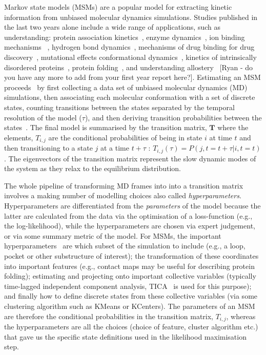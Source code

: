 \documentclass[journal=jacsat,manuscript=article]{achemso}
\begin{document}
Markov state models (MSMs) are a popular model for extracting kinetic information from unbiased molecular dynamics simulations. Studies published in the last two years alone include a wide range of applications, such as understanding:  protein association kinetics~\cite{cannariato_prediction_2022, chakrabarti_litmus_2022}, enzyme dynamics~\cite{koulgi_structural_2021}, ion binding mechanisms~\cite{dutta_distinct_2022, mckiernan_dynamical_2020} , hydrogen bond dynamics~\cite{ibrahim_dynamics_2022}, mechanisms of drug binding for drug discovery~\cite{hu_discovery_2022, pantsar_decisive_2022, hempel_molecular_2021, tosstorff_study_2020, liu_silico_2021}, mutational effects conformational dynamics~\cite{fernandez-quintero_mutation_2021, sharma_comparative_2020}, kinetics of intrinsically disordered proteins~\cite{paul_diversity_2020}, protein folding~\cite{zhou_molecular_2021}, and understanding allostery~\cite{tian_deciphering_2020} [Ryan - do you have any more to add from your first year report here?]. Estimating an MSM proceeds~\cite{noe_markov_2019} by first collecting a data set of unbiased molecular dynamics (MD) simulations, then associating each molecular conformation with a set of discrete states, counting transitions between the states separated by the temporal resolution of the model ($\tau$), and then deriving transition probabilities between the states~\cite{trendelkamp-schroer_estimation_2015}. The final model is summarised by the transition matrix, $\mathbf{T}$ where the elements, $T_{i, j}$ are the conditional probabilities of being in state $i$ at time $t$ and then transitioning to a state $j$ at a time $t+\tau$ : $T_{i,j}(\tau) = P(j, t=t+\tau| i, t=t)$.  The eigenvectors of the transition matrix represent the slow dynamic modes of the system as they relax to the equilibrium distribution. 

The whole pipeline of transforming MD frames into into a transition matrix involves a making number of modelling choices also called \emph{hyperparameters}. Hyperparameters are differentiated from the \emph{parameters} of the model because the latter are calculated from the data via the optimisation of a loss-function (e.g., the log-likelihood), while the hyperparameters are chosen via expert judgement, or via some summary metric of the model\cite{feurer2019hyperparameter}. 
For MSMs, the important hyperparameters~\cite{Optimized_2016, scherer_variational_2019, husic_markov_2018} are which subset of the simulation to include (e.g., a loop, pocket or other substructure of interest); the transformation of these coordinates into important features (e.g., contact maps may be useful for describing protein folding); estimating and projecting onto important collective variables (typically time-lagged independent component analysis, TICA~\cite{perez-hernandezIdentificationSlowMolecular2013a} is used for this purpose); and finally how to define discrete states from these collective variables (via some clustering algorithm such as KMeans or KCenters).  The parameters of an MSM are therefore the conditional probabilities in the transition matrix, $T_{i, j}$, whereas the hyperparameters are all the choices (choice of feature, cluster algorithm etc.) that gave us the specific state definitions used in the likelihood maximisation step.   
\end{document}
